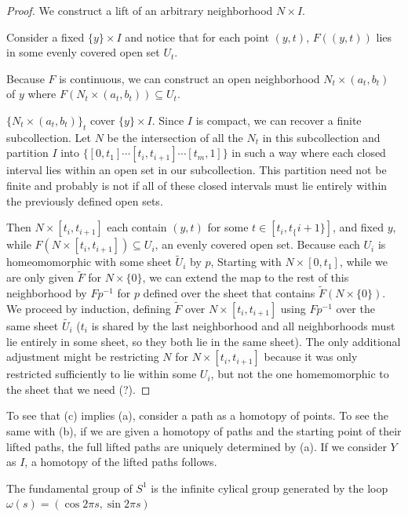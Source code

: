 \documentclass[10pt]{article}
\begin{document}
\begin{proof}
	We construct a lift of an arbitrary neighborhood $N \times I$.

	Consider a fixed $\{y\} \times I$ and notice that for each
	point $(y, t)$,  $F((y, t))$ lies in some evenly covered open set
	$U_t$.

	Because $F$ is continuous, we can construct an open neighborhood $N_t
	\times (a_t, b_t)$ of $y$ where $F(N_t \times (a_t, b_t)) \subseteq U_t$.

	$\{ N_t \times (a_t, b_t) \}_t$ cover $\{y\} \times I$. Since $I$ is compact,
	we can recover a finite subcollection. Let $N$ be the intersection of all the $N_t$ in
	this subcollection and partition $I$ into $\{ [0, t_1] \cdots [t_i, t_{i+1}]
	\cdots [t_m, 1] \}$ in such a way where each closed interval lies within an
	open set in our subcollection. This partition need not be finite and probably
	is not if all of these closed intervals must lie entirely within the
	previously defined open sets.

	Then $N \times [t_i, t_{i+1}]$ each contain $(y, t)$ for some $t \in [t_i,
	t_\{i+1\}]$, and fixed $y$, while $F(N \times [t_i, t_{i+1}]) \subseteq U_i$,
	an evenly covered open set. Because each $U_i$ is homeomomorphic with some
	sheet $\tilde{U}_i$ by $p$, Starting with $N \times [0, t_1]$, while we are
	only given $\tilde{F}$ for $N \times \{0\}$, we can extend the map to the rest of
	this neighborhood by $Fp^{-1}$ for $p$ defined over the sheet that contains
	$\tilde{F}(N \times \{0\})$. We proceed by induction, defining $\tilde{F}$
	over $N \times [t_i, t_{i+1}]$ using $Fp^{-1}$ over the same sheet
	$\tilde{U_i}$ ($t_i$ is shared by the last neighborhood and all neighborhoods
	must lie entirely in some sheet, so they both lie in the same sheet). The
	only additional adjustment might be restricting $N$ for $N \times [t_i,
	t_{i+1}]$ because it was only restricted sufficiently to lie within some
	$U_i$, but not the one homemomorphic to the sheet that we need (?).

\end{proof}

To see that (c) implies (a), consider a path as a homotopy of points. To see
the same with (b), if we are given a homotopy of paths and the starting point
of their lifted paths, the full lifted paths are uniquely determined by (a). If
we consider $Y$ as $I$, a homotopy of the lifted paths follows.

\begin{theorem}[$\Z \cong \pi_1(S^1)$]

	The fundamental group of $S^1$ is the infinite cylical group generated by the
	loop $\omega(s) = (\cos 2\pi s, \sin 2 \pi s)$
\end{theorem}
\end{document}
